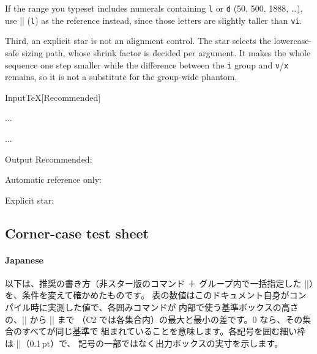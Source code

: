 \documentclass[luatex,fontsize=8pt,paper=b5,twoside]{jlreq}%
\begin{document}
If the range you typeset includes numerals containing \verb|l| or \verb|d| (50, 500, 1888, \dots), use \KKverb|| (\verb|l|) as the reference instead, since those letters are slightly taller than \verb|vi|.

Third, an explicit star is not an alignment control. The star selects the lowercase-safe sizing path, whose shrink factor is decided per argument. It makes the whole sequence one step smaller while the difference between the \verb|i| group and \verb|v|/\verb|x| remains, so it is not a substitute for the group-wide phantom.

\begin{SourceCode}{Input}{TeX}[Recommended]
  {%
    }

  ...

  ...
\end{SourceCode}
\begin{OutPut}{Output}
  Recommended:

  Automatic reference only:\quad{}

  Explicit star:\quad{}
\end{OutPut}

\subsection{Corner-case test sheet}
\paragraph{Japanese}
以下は、推奨の書き方（非スター版のコマンド ＋ グループ内で一括指定した
\KKverb||）を、条件を変えて確かめたものです。
表の数値はこのドキュメント自身がコンパイル時に実測した値で、各囲みコマンドが
内部で使う基準ボックスの高さの、\KKverb|| から \KKverb|| まで
（C2 では各集合内）の最大と最小の差です。0 なら、その集合のすべてが同じ基準で
組まれていることを意味します。各記号を囲む細い枠は \KKverb|\fbox|（0.1\,pt）で、
記号の一部ではなく出力ボックスの実寸を示します。
\end{document}
